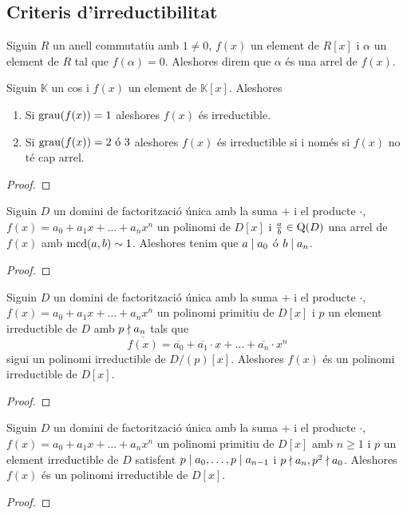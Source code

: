 \documentclass[../Apunts.tex]{subfiles}
\begin{document}
	\subsection{Criteris d'irreductibilitat}
	\begin{definition}[Arrel]
		\label{def:arrel d'un polinomi}
		Siguin \(R\) un anell commutatiu amb \(1\neq0\), \(f(x)\) un element de \(R[x]\) i \(\alpha\) un element de \(R\) tal que \(f(\alpha)=0\). Aleshores direm que \(\alpha\) és una arrel de \(f(x)\).
	\end{definition}
	\begin{proposition}
		Siguin \(\mathbb{K}\) un cos i \(f(x)\) un element de \(\mathbb{K}[x]\). Aleshores
		\begin{enumerate}
			\item Si \(\operatorname{grau}(f(x))=1\) aleshores \(f(x)\) és irreductible.
			\item Si \(\operatorname{grau}(f(x))=2\text{ ó }3\) aleshores \(f(x)\) és irreductible si i només si \(f(x)\) no té cap arrel.
		\end{enumerate}
		\begin{proof}
		\end{proof}
	\end{proposition}
	\begin{proposition}
		Siguin \(D\) un domini de factorització única amb la suma \(+\) i el producte \(\cdot\), \(f(x)=a_{0}+a_{1}x+\dots+a_{n}x^{n}\) un polinomi de \(D[x]\) i \(\frac{a}{b}\in\operatorname{Q}(D)\) una arrel de \(f(x)\) amb \(\operatorname{mcd}(a,b)\sim1\). Aleshores tenim que \(a\mathrel{|} a_{0}\) ó \(b\mathrel{|} a_{n}\).
		\begin{proof}
		\end{proof}
	\end{proposition}
	\begin{theorem}
		\label{thm:Criteri modular}
		Siguin \(D\) un domini de factorització única amb la suma \(+\) i el producte \(\cdot\), \(f(x)=a_{0}+a_{1}x+\dots+a_{n}x^{n}\) un polinomi primitiu de \(D[x]\) i \(p\) un element irreductible de \(D\) amb \(p\mathrel{\nmid} a_{n}\) tals que
		\[\overline{f(x)}=\overline{a_{0}}+\overline{a_{1}}\cdot x+\dots+\overline{a_{n}}\cdot x^{n}\]
		sigui un polinomi irreductible de \(D/(p)[x]\). Aleshores \(f(x)\) és un polinomi irreductible de \(D[x]\).
		\begin{proof}
		\end{proof}
	\end{theorem}
	\begin{theorem}
		\label{thm:Criteri d'Eisenstein}
		Siguin \(D\) un domini de factorització única amb la suma \(+\) i el producte \(\cdot\), \(f(x)=a_{0}+a_{1}x+\dots+a_{n}x^{n}\) un polinomi primitiu de \(D[x]\) amb \(n\geq1\) i \(p\) un element irreductible de \(D\) satisfent \(p\mathrel{|} a_{0},\dots,p\mathrel{|} a_{n-1}\) i \(p\mathrel{\nmid} a_{n},p^{2}\mathrel{\nmid} a_{0}\). Aleshores \(f(x)\) és un polinomi irreductible de \(D[x]\).
		\begin{proof}
		\end{proof}
	\end{theorem}
\end{document}
